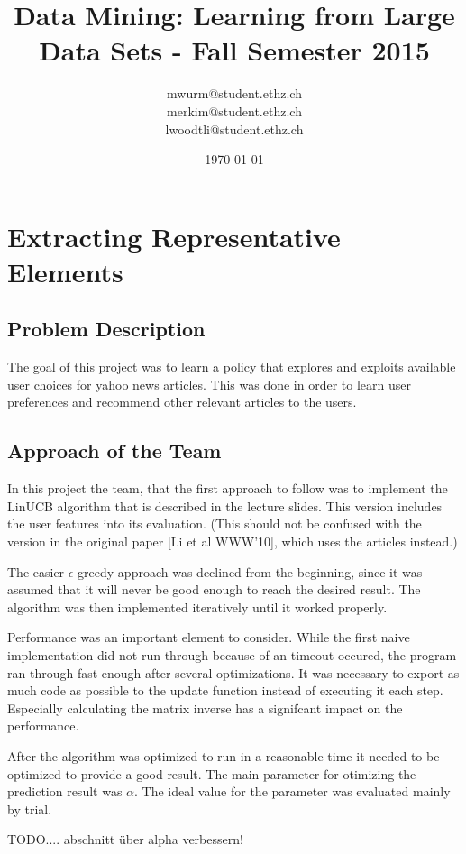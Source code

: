 \documentclass[a4paper, 11pt]{article}
\title{Data Mining: Learning from Large Data Sets - Fall Semester 2015}
\author{mwurm@student.ethz.ch\\ merkim@student.ethz.ch\\ lwoodtli@student.ethz.ch\\}
\date{\today}
\begin{document}
\maketitle

\section*{Extracting Representative Elements} 

\subsection{Problem Description}
The goal of this project was to learn a policy that explores and exploits available user choices for yahoo news articles. This was done in order to learn user preferences and recommend other relevant articles to the users.

\subsection{Approach of the Team}
In this project the team, that the first approach to follow was to implement the LinUCB algorithm that is described in the lecture slides. This version includes the user features into its evaluation. (This should not be confused with the version in the original paper [Li et al WWW'10],  which uses the articles instead.)

The easier $\epsilon$-greedy approach was declined from the beginning, since it was assumed that it will never be good enough to reach the desired result.
The algorithm was then implemented iteratively until it worked properly.

Performance was an important element to consider. While the first naive implementation did not run through because of an timeout occured, the program ran through fast enough after several optimizations. It was necessary to export as much code as possible to the update function instead of executing it each step. Especially calculating the matrix inverse has a signifcant impact on the performance.

After the algorithm was optimized to run in a reasonable time it needed to be optimized to provide a good result. The main parameter for otimizing the prediction result was $\alpha$. The ideal value for the parameter was evaluated mainly by trial.


TODO.... abschnitt über alpha verbessern!
\end{document}
